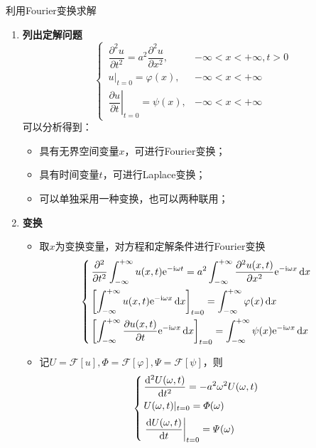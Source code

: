 \solve 利用Fourier变换求解
\begin{enumerate}
	\item \textbf{列出定解问题}
	\begin{equation}
		\begin{cases}
			\, \dfrac{\partial^2 u}{\partial t^2} = a^2 \dfrac{\partial^2 u}{\partial x^2} , & -\infty < x< +\infty,t>0\\[0.5em]
			\, u|_{t = 0} = \varphi(x), & -\infty < x < + \infty\\[0.5em]
			\,\left. \dfrac{\partial u}{\partial t}\right|_{t = 0} = \psi(x), & -\infty < x < +\infty
		\end{cases}
	\end{equation}
	可以分析得到：
	\begin{itemize}
		\item 具有无界空间变量$x$，可进行Fourier变换；
		\item 具有时间变量$t$，可进行Laplace变换；
		\item 可以单独采用一种变换，也可以两种联用；
	\end{itemize}
	
	\item \textbf{变换}
	\begin{itemize}
		\item 取$x$为变换变量，对方程和定解条件进行Fourier变换
		\begin{equation}
			\begin{cases}
				\, \displaystyle \dfrac{\partial^2}{\partial t^2} \int_{-\infty}^{+\infty} u(x,t){\rm{e}}^{- {\rm{i}} \omega t} = a^2 \int_{- \infty}^{+\infty} \dfrac{\partial^2 u(x,t)}{\partial x^2} {\rm{e}}^{- {\rm{i}} \omega x}\,{\rm{d}} x \\[1em]
				\, \displaystyle \left[\int_{- \infty}^{+\infty}u(x,t){\rm{e}}^{-{\rm{i}} \omega x}\, {\rm{d}} x\right]_{t = 0} = \int_{-\infty}^{+ \infty} \varphi(x)\, {\rm{d}} x \\[1em]
				\, \displaystyle \left[\int_{- \infty}^{+\infty} \dfrac{\partial u(x,t)}{\partial t}{\rm{e}}^{- {\rm{i}} \omega x}\, {\rm{d}} x\right]_{t = 0} = \int_{- \infty}^{+\infty} \psi(x){\rm{e}}^{- {\rm{i}} \omega x} \, {\rm{d}} x
			\end{cases}
		\end{equation}
		
		\item 记$U = \mathcal{F}[u], \varPhi = \mathcal{F}[\varphi], \varPsi = \mathcal{F}[\psi]$，则
		\begin{equation}
			\begin{cases}
				\, \displaystyle \dfrac{{\rm{d}}^2 U(\omega, t)}{{\rm{d}} t^2} = -a^2 \omega^2 U(\omega, t)\\[0.5em]
				\, \displaystyle U(\omega, t)|_{t = 0} = \varPhi(\omega)\\[0.5em]
				\, \displaystyle \left. \dfrac{{\rm{d}} U(\omega, t)}{{\rm{d}} t} \right|_{t = 0} = \varPsi(\omega)
			\end{cases}
			\label{无界弦自由振动}
		\end{equation}
	\end{itemize}
	

\end{enumerate}
